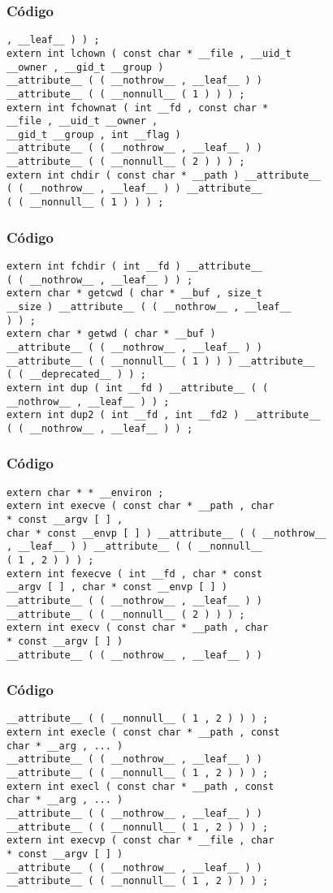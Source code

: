 \documentclass{beamer}
\begin{document}
\begin{frame}[fragile]
\frametitle{C\'odigo}
\begin{verbatim}
, __leaf__ ) ) ; 
extern int lchown ( const char * __file , __uid_t 
__owner , __gid_t __group ) 
__attribute__ ( ( __nothrow__ , __leaf__ ) ) 
__attribute__ ( ( __nonnull__ ( 1 ) ) ) ; 
extern int fchownat ( int __fd , const char * 
__file , __uid_t __owner , 
__gid_t __group , int __flag ) 
__attribute__ ( ( __nothrow__ , __leaf__ ) ) 
__attribute__ ( ( __nonnull__ ( 2 ) ) ) ; 
extern int chdir ( const char * __path ) __attribute__ 
( ( __nothrow__ , __leaf__ ) ) __attribute__ 
( ( __nonnull__ ( 1 ) ) ) ; 
\end{verbatim}
\end{frame}
\begin{frame}[fragile]
\frametitle{C\'odigo}
\begin{verbatim}
extern int fchdir ( int __fd ) __attribute__ 
( ( __nothrow__ , __leaf__ ) ) ; 
extern char * getcwd ( char * __buf , size_t 
__size ) __attribute__ ( ( __nothrow__ , __leaf__ 
) ) ; 
extern char * getwd ( char * __buf ) 
__attribute__ ( ( __nothrow__ , __leaf__ ) ) 
__attribute__ ( ( __nonnull__ ( 1 ) ) ) __attribute__ 
( ( __deprecated__ ) ) ; 
extern int dup ( int __fd ) __attribute__ ( ( 
__nothrow__ , __leaf__ ) ) ; 
extern int dup2 ( int __fd , int __fd2 ) __attribute__ 
( ( __nothrow__ , __leaf__ ) ) ; 
\end{verbatim}
\end{frame}
\begin{frame}[fragile]
\frametitle{C\'odigo}
\begin{verbatim}
extern char * * __environ ; 
extern int execve ( const char * __path , char 
* const __argv [ ] , 
char * const __envp [ ] ) __attribute__ ( ( __nothrow__ 
, __leaf__ ) ) __attribute__ ( ( __nonnull__ 
( 1 , 2 ) ) ) ; 
extern int fexecve ( int __fd , char * const 
__argv [ ] , char * const __envp [ ] ) 
__attribute__ ( ( __nothrow__ , __leaf__ ) ) 
__attribute__ ( ( __nonnull__ ( 2 ) ) ) ; 
extern int execv ( const char * __path , char 
* const __argv [ ] ) 
__attribute__ ( ( __nothrow__ , __leaf__ ) ) 
\end{verbatim}
\end{frame}
\begin{frame}[fragile]
\frametitle{C\'odigo}
\begin{verbatim}
__attribute__ ( ( __nonnull__ ( 1 , 2 ) ) ) ; 
extern int execle ( const char * __path , const 
char * __arg , ... ) 
__attribute__ ( ( __nothrow__ , __leaf__ ) ) 
__attribute__ ( ( __nonnull__ ( 1 , 2 ) ) ) ; 
extern int execl ( const char * __path , const 
char * __arg , ... ) 
__attribute__ ( ( __nothrow__ , __leaf__ ) ) 
__attribute__ ( ( __nonnull__ ( 1 , 2 ) ) ) ; 
extern int execvp ( const char * __file , char 
* const __argv [ ] ) 
__attribute__ ( ( __nothrow__ , __leaf__ ) ) 
__attribute__ ( ( __nonnull__ ( 1 , 2 ) ) ) ; 
\end{verbatim}
\end{frame}
\end{document}
